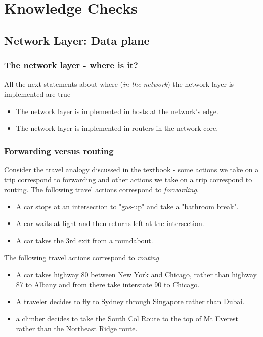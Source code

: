 \section*{Knowledge Checks}

\subsection*{Network Layer: Data plane}
    \subsubsection*{The network layer - where is it?}
    \noindent All the next statements about where (\textit{in the network}) the network layer is implemented are true
    \begin{itemize}
        \item The network layer is implemented in hosts at the network's edge.
        \item The network layer is implemented in routers in the network core.
    \end{itemize}

    \subsubsection*{Forwarding versus routing}
    \noindent Consider the travel analogy discussed in the textbook - some actions we take on a trip correspond to forwarding
    and other actions we take on a trip correspond to routing. The following travel actions correspond to \textit{forwarding}.
    \begin{itemize}
        \item A car stops at an intersection to "gas-up" and take a "bathroom break".
        \item A car waits at light and then returns left at the intersection.
        \item A car takes the 3rd exit from a roundabout. 
    \end{itemize}

    \noindent The following travel actions correspond to \textit{routing}
    \begin{itemize}
        \item A car takes highway 80 between New York and Chicago, rather than highway 87 to Albany and from there take
        interstate 90 to Chicago.
        \item A traveler decides to fly to Sydney through Singapore rather than Dubai.
        \item a climber decides to take the South Col Route to the top of Mt Everest rather than the Northeast Ridge route.
    \end{itemize}

